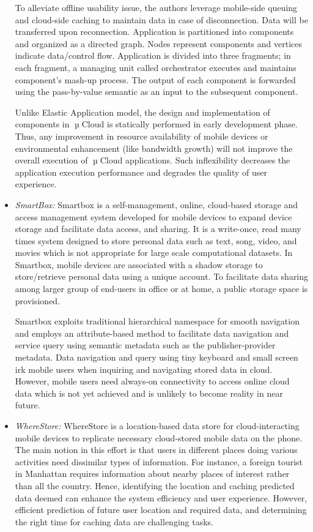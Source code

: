 \documentclass[publish]{IEEEtran}
\begin{document}
\begin{itemize}
To alleviate offline usability issue, the authors leverage mobile-side queuing and cloud-side caching to maintain data in case of disconnection. Data will be transferred upon reconnection. Application is partitioned into components and organized as a directed graph. Nodes represent components and vertices indicate data/control flow.  Application is divided into three fragments; in each fragment, a managing unit called orchestrator executes and maintains component's mash-up process. The output of each component is forwarded using the pass-by-value semantic as an input to the subsequent component. 

Unlike Elastic Application model, the design and implementation of components in $\tcmu$Cloud is statically performed in early development phase. Thus, any improvement in resource availability of mobile devices or environmental enhancement (like bandwidth growth) will not improve the overall execution of $\tcmu$Cloud applications. Such inflexibility decreases the application execution performance and degrades the quality of user experience.

\item \textit{SmartBox:}
Smartbox \cite{Zheng2010} is a self-management, online, cloud-based storage and access management system developed for mobile devices to expand device storage and facilitate data access, and sharing. It is a write-once, read many times system designed to store personal data such as text, song, video, and movies which is not appropriate for large scale computational datasets. In Smartbox, mobile devices are associated with a shadow storage to store/retrieve personal data using a unique account. To facilitate data sharing among larger group of end-users in office or at home, a public storage space is provisioned.

Smartbox exploits traditional hierarchical namespace for smooth navigation and employs an attribute-based method to facilitate data navigation and service query using semantic metadata such as the publisher-provider metadata. Data navigation and query using tiny keyboard and small screen irk mobile users when inquiring and navigating stored data in cloud. However, mobile users need always-on connectivity to access online cloud data which is not yet achieved and is unlikely to become reality in near future. 

\item \textit{WhereStore:}
WhereStore \cite{Stuedi2010} is a location-based data store for cloud-interacting mobile devices to replicate necessary cloud-stored mobile data on the phone. The main notion in this effort is that users in different places doing various activities need dissimilar types of information. For instance, a foreign tourist in Manhattan requires information about nearby places of interest rather than all the country. Hence, identifying the location and caching predicted data deemed can enhance the system efficiency and user experience. However, efficient prediction of future user location and required data, and determining the right time for caching data are challenging tasks.


\end{itemize}
\end{document}
